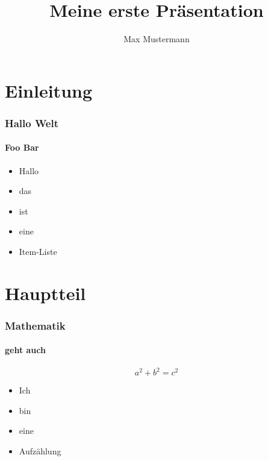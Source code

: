 \documentclass[12pt,ngerman]{beamer}
\author{Max Mustermann}
\title{Meine erste Präsentation}
\begin{document}
\begin{frame}

\maketitle

\end{frame}

\begin{frame}

\tableofcontents

\end{frame}


\section{Einleitung}

\begin{frame}
\frametitle{Hallo Welt}
\framesubtitle{Foo Bar}

\begin{itemize}
\item Hallo
\item das
\item ist 
\item eine 
\item Item-Liste
\end{itemize}
\end{frame}

\section{Hauptteil}

\begin{frame}
\frametitle{Mathematik}
\framesubtitle{geht auch}

\[ a^2 + b^2 = c^2 \]

\begin{itemize}
\item Ich
\item bin 
\item eine
\item Aufzählung
\end{itemize}
\end{frame}
\end{document}
